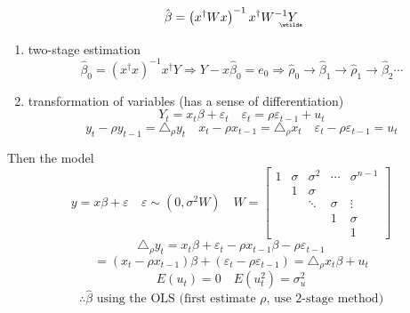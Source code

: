 \documentclass{article}
\begin{document}
\begin{equation*}
\hat{\beta}=\left( x^{\dagger }Wx\right) ^{-1}x^{\dagger }W^{-1}%
\underaccent{\wtilde}{Y}%
\end{equation*}

\begin{enumerate}
\item two-stage estimation%
\begin{equation*}
\hat{\beta}_{0}=\left( x^{\dagger }x\right) ^{-1}x^{\dagger }Y\Rightarrow Y-x%
\hat{\beta}_{0}=e_{0}\Rightarrow \hat{\rho}_{0}\rightarrow \hat{\beta}%
_{1}\rightarrow \hat{\rho}_{1}\rightarrow \hat{\beta}_{2}\cdots 
\end{equation*}

\item transformation of variables (has a sense of differentiation)%
\begin{equation*}
Y_{t}=x_{t}\beta +\varepsilon _{t}\quad \varepsilon _{t}=\rho \varepsilon
_{t-1}+u_{t}
\end{equation*}%
\begin{equation*}
y_{t}-\rho y_{t-1}=\triangle _{\rho }y_{t}\quad x_{t}-\rho x_{t-1}=\triangle
_{\rho }x_{t}\quad \varepsilon _{t}-\rho \varepsilon _{t-1}=u_{t}
\end{equation*}
\end{enumerate}

\bigskip 

Then the model%
\begin{equation*}
y=x\beta +\varepsilon \quad \varepsilon \sim \left( 0,\sigma ^{2}W\right)
\quad W=\left[ 
\begin{array}{ccccc}
1 & \sigma  & \sigma ^{2} & \cdots  & \sigma ^{n-1} \\ 
& 1 & \sigma  &  &  \\ 
&  & \ddots  & \sigma  & \vdots  \\ 
&  &  & 1 & \sigma  \\ 
&  &  &  & 1%
\end{array}%
\right] 
\end{equation*}%
\begin{equation*}
\triangle _{\rho }y_{t}=x_{t}\beta +\varepsilon _{t}-\rho x_{t-1}\beta -\rho
\varepsilon _{t-1}
\end{equation*}%
\begin{equation*}
=\left( x_{t}-\rho x_{t-1}\right) \beta +\left( \varepsilon _{t}-\rho
\varepsilon _{t-1}\right) =\triangle _{\rho }x_{t}\beta +u_{t}
\end{equation*}%
\begin{equation*}
E\left( u_{t}\right) =0\quad E\left( u_{t}^{2}\right) =\sigma _{u}^{2}
\end{equation*}%
\begin{equation*}
\therefore \hat{\beta}\text{ using the OLS (first estimate }\rho \text{, use
2-stage method)}
\end{equation*}
\end{document}
